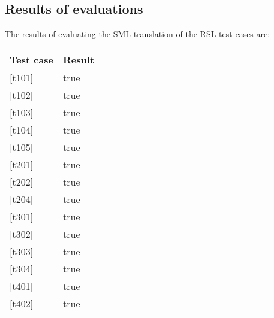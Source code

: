 \documentclass[a4]{article}
\begin{document}
\subsection{Results of evaluations}

The results of evaluating the SML translation of the RSL test cases are:

\begin{table}[h]
\begin{tabular}{l|l}
Test case  & Result                                                                                      \\ \hline
{[}t101{]} & true                                                                                        \\
{[}t102{]} & true                                                                                        \\
{[}t103{]} & true                                                                                        \\
{[}t104{]} & true                                                                                        \\
{[}t105{]} & true                                                                                        \\
{[}t201{]} & true                                                                                        \\
{[}t202{]} & true                                                                                        \\
{[}t204{]} & true                                                                                        \\
{[}t301{]} & true                                                                                        \\
{[}t302{]} & true                                                                                        \\
{[}t303{]} & true                                                                                        \\
{[}t304{]} & true                                                                                        \\
{[}t401{]} & true                                                                                        \\
{[}t402{]} & true                                                                                        \\

\end{tabular}
\end{table}
\end{document}
